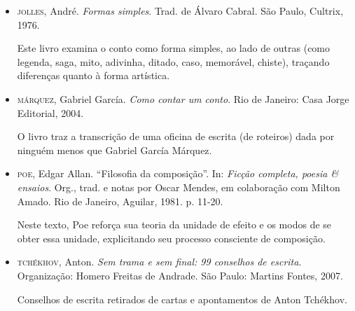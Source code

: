 \documentclass[11pt]{extarticle}
\begin{document}
\begin{itemize}
\item\textsc{jolles}, André. \emph{Formas simples}. Trad. de Álvaro Cabral. São Paulo,
Cultrix, 1976. 

Este livro examina o conto como forma simples, ao
lado de outras (como legenda, saga, mito, adivinha, ditado, caso,
memorável, chiste), traçando diferenças quanto à forma artística.

\item\textsc{márquez}, Gabriel García. \emph{Como contar um conto}. Rio de Janeiro: Casa Jorge Editorial, 2004.

O livro traz a transcrição de uma oficina de escrita (de roteiros) dada por ninguém menos que Gabriel García Márquez.

\item\textsc{poe}, Edgar Allan. ``Filosofia da composição''. In: \emph{Ficção
completa, poesia \& ensaios}. Org., trad. e notas por Oscar Mendes, em
colaboração com Milton Amado. Rio de Janeiro, Aguilar, 1981. p. 11-20.

Neste texto, Poe reforça sua teoria da unidade de efeito e os modos
de se obter essa unidade, explicitando seu processo consciente de
composição.

\item\textsc{tchékhov}, Anton. \emph{Sem trama e sem final: 99 conselhos de escrita}. Organização: Homero Freitas de Andrade.
São Paulo: Martins Fontes, 2007.

Conselhos de escrita retirados de cartas e apontamentos de Anton Tchékhov. 

\end{itemize}
\end{document}
